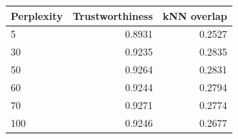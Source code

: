 \begin{tabular}{lrr}
\toprule
Perplexity & Trustworthiness & kNN overlap \\
\midrule
5 & 0.8931 & 0.2527 \\
30 & 0.9235 & 0.2835 \\
50 & 0.9264 & 0.2831 \\
60 & 0.9244 & 0.2794 \\
70 & 0.9271 & 0.2774 \\
100 & 0.9246 & 0.2677 \\
\bottomrule
\end{tabular}

